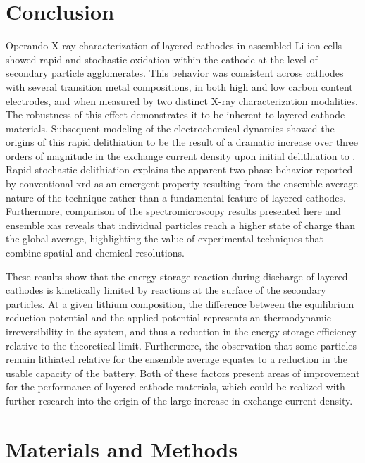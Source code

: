 \documentclass{article}
\begin{document}
\section{Conclusion}

Operando X-ray characterization of layered cathodes in assembled
Li-ion cells showed rapid and stochastic oxidation within the cathode
at the level of secondary particle agglomerates. This behavior was
consistent across cathodes with several transition metal compositions,
in both high and low carbon content electrodes, and when measured by
two distinct X-ray characterization modalities. The robustness of this
effect demonstrates it to be inherent to layered cathode
materials. Subsequent modeling of the electrochemical dynamics showed
the origins of this rapid delithiation to be the result of a dramatic
increase over three orders of magnitude in the exchange current
density upon initial delithiation to . Rapid stochastic
delithiation explains the apparent two-phase behavior reported by
conventional \gls{xrd} as an emergent property resulting from the
ensemble-average nature of the technique rather than a fundamental
feature of layered cathodes. Furthermore, comparison of the
spectromicroscopy results presented here and ensemble \gls{xas}
reveals that individual particles reach a higher state of charge than
the global average, highlighting the value of experimental techniques
that combine spatial and chemical resolutions.

These results show that the energy storage reaction during discharge
of layered cathodes is kinetically limited by reactions at the surface
of the secondary particles. At a given lithium composition, the
difference between the equilibrium reduction potential and the applied
potential represents an thermodynamic irreversibility in the system,
and thus a reduction in the energy storage efficiency relative to the
theoretical limit. Furthermore, the observation that some particles
remain lithiated relative for the ensemble average equates to a
reduction in the usable capacity of the battery. Both of these factors
present areas of improvement for the performance of layered cathode
materials, which could be realized with further research into the
origin of the large increase in exchange current density.

\section*{Materials and Methods}
\end{document}
